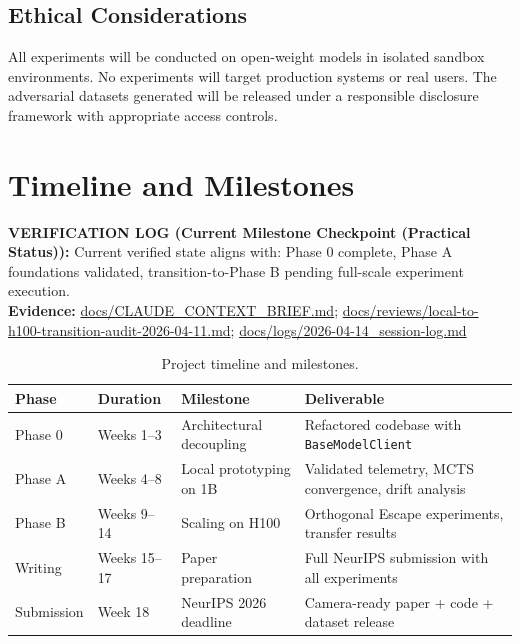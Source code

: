 \documentclass[10pt]{article}
\newcommand{\verifybox}[3]{%
\vspace{0.6em}
\noindent\colorbox{yellow!20}{%
\parbox{\dimexpr\linewidth-2\fboxsep\relax}{%
\textbf{VERIFICATION LOG (#1):} #2\\
\textbf{Evidence:} #3
}}%
\vspace{0.6em}
}
\begin{document}
\subsection{Ethical Considerations}

All experiments will be conducted on open-weight models in isolated sandbox environments. No experiments will target production systems or real users. The adversarial datasets generated will be released under a responsible disclosure framework with appropriate access controls.

\section{Timeline and Milestones}


\verifybox
{Current Milestone Checkpoint (Practical Status)}
{Current verified state aligns with: Phase 0 complete, Phase A foundations validated, transition-to-Phase B pending full-scale experiment execution.}
{\url{docs/CLAUDE_CONTEXT_BRIEF.md}; \url{docs/reviews/local-to-h100-transition-audit-2026-04-11.md}; \url{docs/logs/2026-04-14_session-log.md}}

\begin{table}[h]
\centering
\begin{tabular}{@{}llll@{}}
\toprule
\textbf{Phase} & \textbf{Duration} & \textbf{Milestone} & \textbf{Deliverable} \\
\midrule
Phase 0 & Weeks 1--3 & Architectural decoupling & Refactored codebase with \texttt{BaseModelClient} \\
Phase A & Weeks 4--8 & Local prototyping on 1B & Validated telemetry, MCTS convergence, drift analysis \\
Phase B & Weeks 9--14 & Scaling on H100 & Orthogonal Escape experiments, transfer results \\
Writing & Weeks 15--17 & Paper preparation & Full NeurIPS submission with all experiments \\
Submission & Week 18 & NeurIPS 2026 deadline & Camera-ready paper + code + dataset release \\
\bottomrule
\end{tabular}
\caption{Project timeline and milestones.}
\label{tab:timeline}
\end{table}
\end{document}
